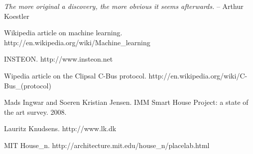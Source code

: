 \emph{The more original a discovery, the more obvious it seems afterwards.} -- Arthur Koestler

\begin{thebibliography}{0}

Wikipedia article on machine learning. http:/\slash en.wikipedia.org\slash wiki\slash Machine\_learning


INSTEON. http:/\slash www.insteon.net


Wipedia article on the Clipsal C-Bus protocol. http:/\slash en.wikipedia.org\slash wiki\slash C-Bus\_(protocol)


Mads Ingwar and Soeren Kristian Jensen. IMM Smart House Project: a state of the art survey. 2008.


Lauritz Knudsens. http:/\slash www.lk.dk


MIT House\_n. http:/\slash architecture.mit.edu\slash house\_n\slash placelab.html


\end{thebibliography}




